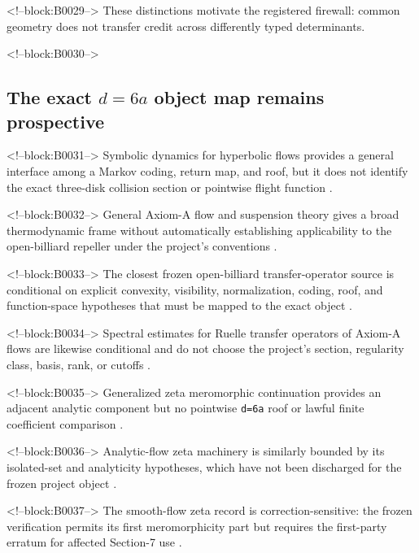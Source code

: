 \documentclass[11pt,a4paper]{article}
\begin{document}
<!--block:B0029-->
These distinctions motivate the registered firewall: common geometry does not transfer credit across differently typed determinants.

<!--block:B0030-->
\subsection{\texorpdfstring{The exact \(d=6a\) object map remains prospective}{The exact d=6a object map remains prospective}}

<!--block:B0031-->
Symbolic dynamics for hyperbolic flows provides a general interface among a Markov coding, return map, and roof, but it does not identify the exact three-disk collision section or pointwise flight function
\citep{P30-S07}.

<!--block:B0032-->
General Axiom-A flow and suspension theory gives a broad thermodynamic frame without automatically establishing applicability to the open-billiard repeller under the project's conventions
\citep{P30-S08}.

<!--block:B0033-->
The closest frozen open-billiard transfer-operator source is conditional on explicit convexity, visibility, normalization, coding, roof, and function-space hypotheses that must be mapped to the exact object
\citep{P30-S11}.

<!--block:B0034-->
Spectral estimates for Ruelle transfer operators of Axiom-A flows are likewise conditional and do not choose the project's section, regularity class, basis, rank, or cutoffs
\citep{P30-S12}.

<!--block:B0035-->
Generalized zeta meromorphic continuation provides an adjacent analytic component but no pointwise \texttt{d=6a} roof or lawful finite coefficient comparison
\citep{P30-S15}.

<!--block:B0036-->
Analytic-flow zeta machinery is similarly bounded by its isolated-set and analyticity hypotheses, which have not been discharged for the frozen project object
\citep{P30-S16}.

<!--block:B0037-->
The smooth-flow zeta record is correction-sensitive: the frozen verification permits its first meromorphicity part but requires the first-party erratum for affected Section-7 use
\citep{P30-S17}.
\end{document}
